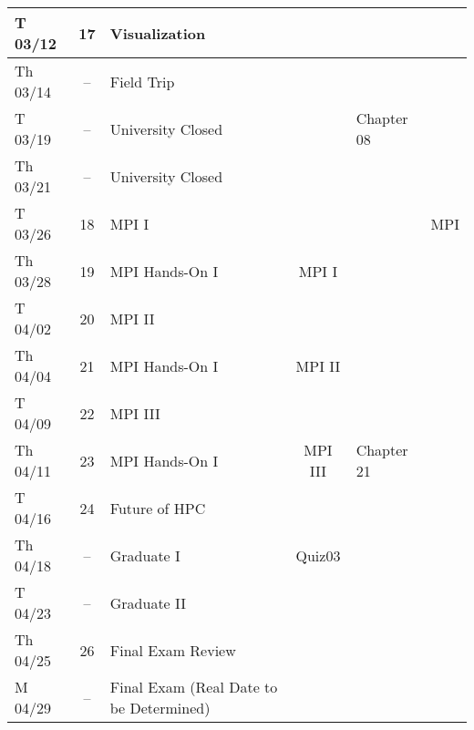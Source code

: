 \begin{center}
\begin{table}[h]
{\begin{tabular}{|l|c|l|c|l|l|}
 T 03/12 & 17 & Visualization &              &               &    \\ \hline
 Th 03/14 & -- & Field Trip &              &               &    \\ \hline
 T 03/19 & -- & University Closed  &              & Chapter 08    &    \\ \hline
 Th 03/21 & -- & University Closed    &              &               &    \\ \hline
 T 03/26 & 18 & MPI I &              &               & MPI   \\ \hline
 Th 03/28 & 19 & MPI Hands-On I & MPI I        &               &    \\ \hline
 T 04/02 & 20 & MPI II &              &               &    \\ \hline
 Th 04/04 & 21 & MPI Hands-On I & MPI II       &               &    \\ \hline
 T 04/09 & 22 & MPI III &              &               &    \\ \hline
 Th 04/11 & 23 & MPI Hands-On I & MPI III      & Chapter 21    &    \\ \hline
 T 04/16 & 24 & Future of HPC &              &               &    \\ \hline
 Th 04/18 & -- & Graduate I & Quiz03       &               &    \\ \hline
 T 04/23 & -- & Graduate II &              &               &    \\ \hline
 Th 04/25 & 26 & Final Exam Review &         &               &    \\ \hline
 M 04/29 & -- & Final Exam (Real Date to be Determined) &              &  &    \\ \hline
\end{tabular}%
}\end{table}
\end{center}